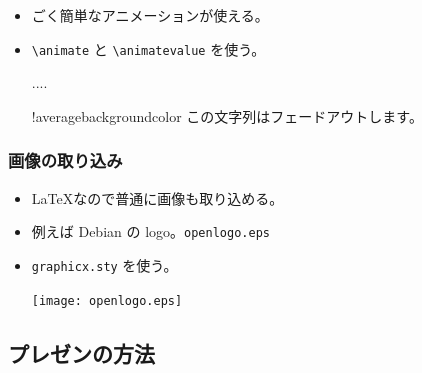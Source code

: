 \documentclass[mingoth,a4paper]{jsarticle}
\begin{document}
\begin{commandline}
\begin{itemize}
\item ごく簡単なアニメーションが使える。
\item \verb|\animate| と \verb|\animatevalue| を使う。

\begin{commandline}
\newcount\opaqueness
\begin{frame}
  ....
\begin{colormixin}
{\the\opaqueness!averagebackgroundcolor}
この文字列はフェードアウトします。
\end{colormixin}
\end{frame}
\end{commandline}

\end{itemize}


\subsubsection{画像の取り込み}

\begin{itemize}
\item \LaTeX{}なので普通に画像も取り込める。
\item 例えば Debian の logo。\texttt{openlogo.eps}
\item \texttt{graphicx.sty} を使う。

\begin{commandline}
\texttt{[image: openlogo.eps]}
\end{commandline}

\end{itemize}

\subsection{プレゼンの方法}


\end{commandline}
\end{document}
